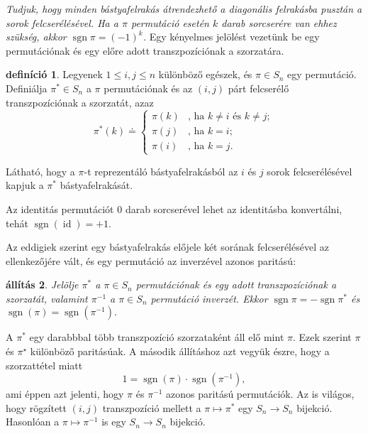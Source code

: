 \documentclass[a4paper, showtrims]{memoir}
\makeatletter
\renewenvironment{proof}[1][\proofname]
    {\par\pushQED{\qed}%
    \normalfont \topsep6\p@\@plus6\p@\relax
    \trivlist
    \item[\hskip\labelsep
        \itshape
    #1\@addpunct{:}]\ignorespaces}
    {\popQED\endtrivlist\@endpefalse}
\theoremstyle{plain}
\newtheorem{proposition}{állítás}[chapter]
\theoremstyle{remark}
\theoremstyle{definition}
\newtheorem{definition}[proposition]{definíció}
\DeclareMathOperator{\sgn}{sgn}
\DeclareMathOperator{\id}{id}
\makeatother
\begin{document}
    \emph{%
    	Tudjuk, hogy minden bástyafelrakás átrendezhető a diagonális felrakásba pusztán a sorok felcserélésével.
    	Ha a $\pi$ permutáció esetén $k$ darab sorcserére van ehhez szükség,
    	akkor $\sgn \pi=\left( -1 \right)^k$.
    }
Egy kényelmes jelölést vezetünk be egy permutációnak és egy előre adott transzpozíciónak a szorzatára.
\begin{definition}
	Legyenek $1\leq i,j\leq n$ különböző egészek,
	és $\pi \in S_{n}$ egy permutáció.
	Definiálja $\pi ^{\ast }\in S_{n}$ a $\pi$ permutációnak és az $\left( i,j \right)$ párt felcserélő transzpozíciónak a szorzatát,
	azaz
	\[
		\pi ^{\ast }\left( k\right) \doteq \left\{
		\begin{array}{ll}
			\pi \left( k\right) &
			\text{, ha }k\neq i\text{ és }k\neq j; \\
			\pi \left( j\right) & \text{, ha }k=i; \\
			\pi \left( i\right) & \text{, ha }k=j.
		\end{array}
		\right.
	\]
\end{definition}
Látható,
hogy a $\pi$-t reprezentáló bástyafelrakásból az $i$ és $j$ sorok felcserélésével kapjuk a $\pi^{\ast}$ bástyafelrakását.

Az identitás permutációt $0$ darab sorcserével lehet az identitásba konvertálni,
tehát $\sgn(\id)=+1$.

Az eddigiek szerint egy bástyafelrakás előjele két sorának felcserélésével az ellenkezőjére vált, és 
egy permutáció az inverzével azonos paritású:
\begin{proposition}
        Jelölje $\pi^\ast$ a $\pi\in S_n$ permutációnak és egy adott transzpozíciónak a szorzatát,
        valamint $\pi^{-1}$ a $\pi\in S_n$ permutáció inverzét.
        	Ekkor
            \(\sgn \pi=-\sgn\pi^\ast
        	\)
            és
            \(
            	\sgn\left( \pi \right)=\sgn\left( \pi^{-1} \right).
            \)
\end{proposition}
\begin{proof}
    A $\pi^{\ast}$ egy darabbbal több transzpozíció szorzataként áll elő mint $\pi$.
    Ezek szerint $\pi$ és $\pi^\star$ különböző paritásúak.
    A második állításhoz azt vegyük észre, hogy a szorzattétel miatt
    \[
        1=\sgn\left( \pi \right)\cdot\sgn\left( \pi^{-1} \right),
    \]
    ami éppen azt jelenti, hogy $\pi$ és $\pi^{-1}$ azonos paritású permutációk.
\end{proof}
Az is világos, 
hogy rögzített $\left( i,j \right)$ transzpozíció mellett 
a $\pi\mapsto\pi^\ast$ egy $S_n\to S_n$ bijekció.
Hasonlóan 
a $\pi\mapsto\pi^{-1}$ is egy $S_n\to S_n$ bijekció.
\end{document}
